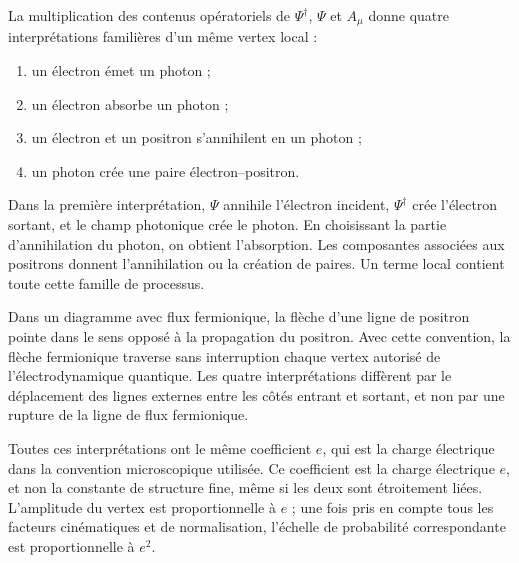 \begin{classroomqa}
\end{classroomqa}

La multiplication des contenus opératoriels de \(\Psi^\dagger\), \(\Psi\) et \(A_\mu\) donne quatre interprétations familières d’un même vertex local :
\begin{enumerate}
\item un électron émet un photon ;
\item un électron absorbe un photon ;
\item un électron et un positron s’annihilent en un photon ;
\item un photon crée une paire électron--positron.
\end{enumerate}
Dans la première interprétation, \(\Psi\) annihile l’électron incident, \(\Psi^\dagger\) crée l’électron sortant, et le champ photonique crée le photon. En choisissant la partie d’annihilation du photon, on obtient l’absorption. Les composantes associées aux positrons donnent l’annihilation ou la création de paires. Un terme local contient toute cette famille de processus.

Dans un diagramme avec flux fermionique, la flèche d’une ligne de positron pointe dans le sens opposé à la propagation du positron. Avec cette convention, la flèche fermionique traverse sans interruption chaque vertex autorisé de l’électrodynamique quantique. Les quatre interprétations diffèrent par le déplacement des lignes externes entre les côtés entrant et sortant, et non par une rupture de la ligne de flux fermionique.

Toutes ces interprétations ont le même coefficient \(e\), qui est la charge électrique dans la convention microscopique utilisée. Ce coefficient est la charge électrique \(e\), et non la constante de structure fine, même si les deux sont étroitement liées. L’amplitude du vertex est proportionnelle à \(e\) ; une fois pris en compte tous les facteurs cinématiques et de normalisation, l’échelle de probabilité correspondante est proportionnelle à \(e^2\).

